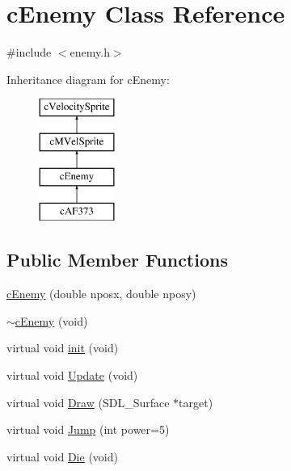 \hypertarget{classc_enemy}{\section{c\-Enemy Class Reference}
\label{classc_enemy}
}


{\ttfamily \#include $<$enemy.\-h$>$}

Inheritance diagram for c\-Enemy\-:\begin{figure}[H]
\begin{center}
\leavevmode
\includegraphics[height=4.000000cm]{classc_enemy}
\end{center}
\end{figure}
\subsection*{Public Member Functions}
\begin{DoxyCompactItemize}
\item 
\hyperlink{classc_enemy_a7418f807e9a0180e2a9e7d57365acda1}{c\-Enemy} (double nposx, double nposy)
\item 
\hyperlink{classc_enemy_a045bed08683deb6e3b9ce89cdb5f38a9}{$\sim$c\-Enemy} (void)
\item 
virtual void \hyperlink{classc_enemy_ad43a7bf539bec2be57bbdbf02fa25f9f}{init} (void)
\item 
virtual void \hyperlink{classc_enemy_af63fe08e8a91d670c29c81b4dae76cc7}{Update} (void)
\item 
virtual void \hyperlink{classc_enemy_a320a23b20a57397271e7081071e0d557}{Draw} (S\-D\-L\-\_\-\-Surface $\ast$target)
\item 
virtual void \hyperlink{classc_enemy_a439ec2c3f7ff12f154de3e1ec9e42f65}{Jump} (int power=5)
\item 
virtual void \hyperlink{classc_enemy_ab9959c970d97265938fecec544d5fa49}{Die} (void)
\end{DoxyCompactItemize}
